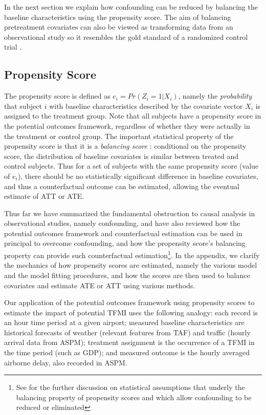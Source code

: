 \documentclass[conference]{IEEEtran}
\begin{document}
In the next section we explain how confounding can be reduced by balancing the baseline characteristics using the propensity score.  The aim of balancing pretreatment covariates can also be viewed as transforming data from an observational study so it resembles the gold standard of a randomized control trial \cite{austin2011introduction}.  

\subsection{Propensity Score}
The propensity score is defined as $e_i=Pr(Z_i=1|X_i)$, namely the \emph{probability} that subject $i$ with baseline characteristics described by the covariate vector $X_i$ is assigned to the treatment group.  Note that all subjects have a propensity score in the potential outcomes framework, regardless of whether they were actually in the treatment or control group.  The important statistical property of the propensity score is that it is a \emph{balancing score} \cite{austin2011introduction}: conditional on the propensity score, the distribution of baseline covariates is similar between treated and control subjects.  Thus for a set of subjects with the same propensity score (value of $e_i$), there should be no statistically significant difference in baseline covariates, and thus a counterfactual outcome can be estimated, allowing the eventual estimate of ATT or ATE.  

Thus far we have summarized the fundamental obstruction to causal analysis in observational studies, namely confounding, and have also reviewed how the potential outcomes framework and counterfactual estimation can be used in principal to overcome confounding, and how the propensity score's balancing property can provide such counterfactual estimation\footnote{See \cite{austin2011introduction} for the further discussion on statistical assumptions that underly the balancing property of propensity scores and which allow confounding to be reduced or eliminated}. In the appendix, we clarify the mechanics of how propensity scores are estimated, namely the various model and the model fitting procedures, and how the scores are then used to balance covariates and estimate ATE or ATT using various methods. 

Our application of the potential outcomes framework using propensity scores to estimate the impact of potential TFMI uses the following analogy: each record is an hour time period at a given airport; measured baseline characteristics are historical forecasts of weather (relevant features from TAF) and traffic (hourly arrival data from ASPM); treatment assignment is the occurrence of a TFMI in the time period (such as GDP); and measured outcome is the hourly averaged airborne delay, also recorded in ASPM.  
\end{document}
